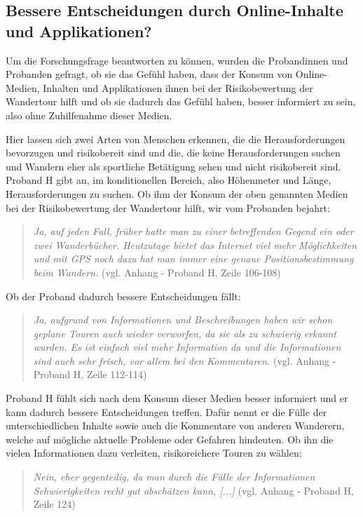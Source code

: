 \subsection{Bessere Entscheidungen durch Online-Inhalte und Applikationen?}

Um die Forschungsfrage beantworten zu können, wurden die Probandinnen und Probanden gefragt, ob sie das Gefühl haben, dass der Konsum von Online-Medien, Inhalten und Applikationen ihnen bei der Risikobewertung der Wandertour hilft und ob sie dadurch das Gefühl haben, besser informiert zu sein, also ohne Zuhilfenahme dieser Medien.

Hier lassen sich zwei Arten von Menschen erkennen, die die Herausforderungen bevorzugen und risikobereit sind und die, die keine Herausforderungen suchen und Wandern eher als sportliche Betätigung sehen und nicht risikobereit sind. Proband H gibt an, im konditionellen Bereich, also Höhenmeter und Länge, Herausforderungen zu suchen. Ob ihm der Konsum der oben genannten Medien bei der Risikobewertung der Wandertour hilft, wir vom Probanden bejahrt:

\begin{quote}
	\textit{\glqq Ja, auf jeden Fall, früher hatte man zu einer betreffenden Gegend ein oder zwei Wanderbücher. Heutzutage bietet das Internet viel mehr Möglichkeiten und mit GPS noch dazu hat man immer eine genaue Positionsbestimmung beim Wandern.\grqq} (vgl. Anhang - Proband H, Zeile 106-108)
\end{quote}

Ob der Proband dadurch bessere Entscheidungen fällt:

\begin{quote}
	\textit{\glqq Ja, aufgrund von Informationen und Beschreibungen haben wir schon geplane Touren auch wieder verworfen, da sie als zu schwierig erkannt wurden. Es ist einfach viel mehr Information da und die Informationen sind auch sehr frisch, vor allem bei den Kommentaren.\grqq} (vgl. Anhang - Proband H, Zeile 112-114)
\end{quote}

Proband H fühlt sich nach dem Konsum dieser Medien besser informiert und er kann dadurch bessere Entscheidungen treffen. Dafür nennt er die Fülle der unterschiedlichen Inhalte sowie auch die Kommentare von anderen Wanderern, welche auf mögliche aktuelle Probleme oder Gefahren hindeuten. Ob ihn die vielen Informationen dazu verleiten, risikoreichere Touren zu wählen:

\begin{quote}
	\textit{\glqq Nein, eher gegenteilig, da man durch die Fülle der Informationen Schwierigkeiten recht gut abschätzen kann, [...]\grqq} (vgl. Anhang - Proband H, Zeile 124)
\end{quote}

